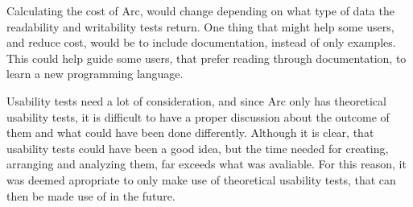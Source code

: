 Calculating the cost of Arc, would change depending on what type of data the readability and writability tests return. One thing that might help some users, and reduce cost, would be to include documentation, instead of only examples. This could help guide some users, that prefer reading through documentation, to learn a new programming language. 

Usability tests need a lot of consideration, and since Arc only has theoretical usability tests, it is difficult to have a proper discussion about the outcome of them and what could have been done differently. 
Although it is clear, that usability tests could have been a good idea, but the time needed for creating, arranging and analyzing them, far exceeds what was avaliable. For this reason, it was deemed apropriate to only make use of theoretical usability tests, that can then be made use of in the future.



